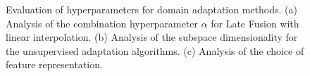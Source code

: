 \begin{figure}
\centering
{}
\caption{Evaluation of hyperparameters for domain adaptation methods. (a) Analysis of the combination hyperparameter $\alpha$ for Late Fusion with linear interpolation. (b) Analysis of the subspace dimensionality for the unsupervised adaptation algorithms. (c) Analysis of the choice of feature representation. }
\label{fig:hyperparam-eval}
\end{figure}
